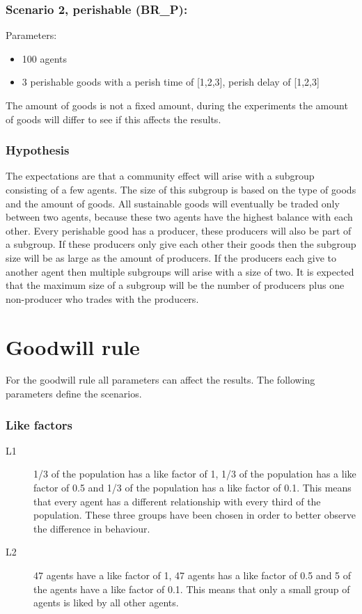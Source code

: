 \documentclass[twoside,openright]{uva-bachelor-thesis}
\begin{document}
\subsubsection{Scenario 2, perishable (BR\_P):}
Parameters:
\begin{itemize}
\item	100 agents
\item	3 perishable goods with a perish time of [1,2,3], perish delay of [1,2,3]
\end{itemize}
The amount of goods is not a fixed amount, during the experiments the amount of goods will differ to see if this affects the results.

\subsubsection{Hypothesis}
The expectations are that a community effect will arise with a subgroup consisting of a few agents. The size of this subgroup is based on the type of goods and the amount of goods. All sustainable goods will eventually be traded only between two agents, because these two agents have the highest balance with each other. Every perishable good has a producer, these producers will also be part of a subgroup. If these producers only give each other their goods then the subgroup size will be as large as the amount of producers. If the producers each give to another agent then multiple subgroups will arise with a size of two. It is expected that the maximum size of a subgroup will be the number of producers plus one non-producer who trades with the producers.

\section{Goodwill rule}
For the goodwill rule all parameters can affect the results. The following parameters define the scenarios.
\subsubsection{Like factors}
\begin{description}
\item[L1]	1/3 of the population has a like factor of 1, 1/3 of the population has a like factor of 0.5 and 1/3 of the population has a like factor of 0.1. This means that every agent has a different relationship with every third of the population. These three groups have been chosen in order to better observe the difference in behaviour.
\item[L2]	47 agents have a like factor of 1, 47 agents has a like factor of 0.5 and 5 of the agents have a like factor of 0.1. This means that only a small group of agents is liked by all other agents.
\end{description}
\end{document}
